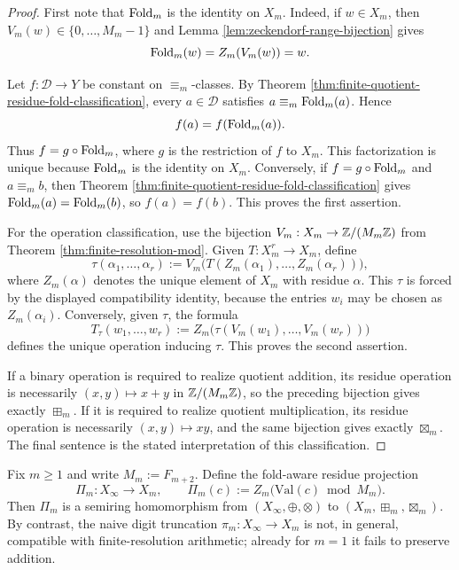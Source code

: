 \begin{proof}
First note that \(\operatorname{Fold}_m\) is the identity on \(X_m\). Indeed, if \(w\in X_m\), then \(V_m(w)\in\{0,\dots,M_m-1\}\) and Lemma \ref{lem:zeckendorf-range-bijection} gives
\[
\operatorname{Fold}_m(w)=Z_m(V_m(w))=w.
\]

Let \(f:\mathcal D\to Y\) be constant on \(\equiv_m\)-classes. By Theorem \ref{thm:finite-quotient-residue-fold-classification}, every \(a\in\mathcal D\) satisfies \(a\equiv_m\operatorname{Fold}_m(a)\). Hence
\[
f(a)=f(\operatorname{Fold}_m(a)).
\]
Thus \(f=g\circ\operatorname{Fold}_m\), where \(g\) is the restriction of \(f\) to \(X_m\). This factorization is unique because \(\operatorname{Fold}_m\) is the identity on \(X_m\). Conversely, if \(f=g\circ\operatorname{Fold}_m\) and \(a\equiv_m b\), then Theorem \ref{thm:finite-quotient-residue-fold-classification} gives \(\operatorname{Fold}_m(a)=\operatorname{Fold}_m(b)\), so \(f(a)=f(b)\). This proves the first assertion.

For the operation classification, use the bijection \(V_m:X_m\to\mathbb{Z}/(M_m\mathbb{Z})\) from Theorem \ref{thm:finite-resolution-mod}. Given \(T:X_m^r\to X_m\), define
\[
\tau(\alpha_1,
\dots,\alpha_r)
:=V_m\bigl(T(Z_m(\alpha_1),\dots,Z_m(\alpha_r))\bigr),
\]
where \(Z_m(\alpha)\) denotes the unique element of \(X_m\) with residue \(\alpha\). This \(\tau\) is forced by the displayed compatibility identity, because the entries \(w_i\) may be chosen as \(Z_m(\alpha_i)\). Conversely, given \(\tau\), the formula
\[
T_\tau(w_1,
\dots,w_r)
:=Z_m\bigl(\tau(V_m(w_1),\dots,V_m(w_r))\bigr)
\]
defines the unique operation inducing \(\tau\). This proves the second assertion.

If a binary operation is required to realize quotient addition, its residue operation is necessarily \((x,y)\mapsto x+y\) in \(\mathbb{Z}/(M_m\mathbb{Z})\), so the preceding bijection gives exactly \(\boxplus_m\). If it is required to realize quotient multiplication, its residue operation is necessarily \((x,y)\mapsto xy\), and the same bijection gives exactly \(\boxtimes_m\). The final sentence is the stated interpretation of this classification.
\end{proof}

\begin{proposition}\label{prop:finite-stable-compatibility-warning}
Fix \(m\ge 1\) and write \(M_m:=F_{m+2}\). Define the fold-aware residue projection
\[
\Pi_m:X_\infty\longrightarrow X_m,
\qquad
\Pi_m(c):=Z_m\bigl(\mathrm{Val}(c)\bmod M_m\bigr).
\]
Then \(\Pi_m\) is a semiring homomorphism from \((X_\infty,\oplus,\otimes)\) to \((X_m,\boxplus_m,\boxtimes_m)\). By contrast, the naive digit truncation \(\pi_m:X_\infty\to X_m\) is not, in general, compatible with finite-resolution arithmetic; already for \(m=1\) it fails to preserve addition.
\end{proposition}

